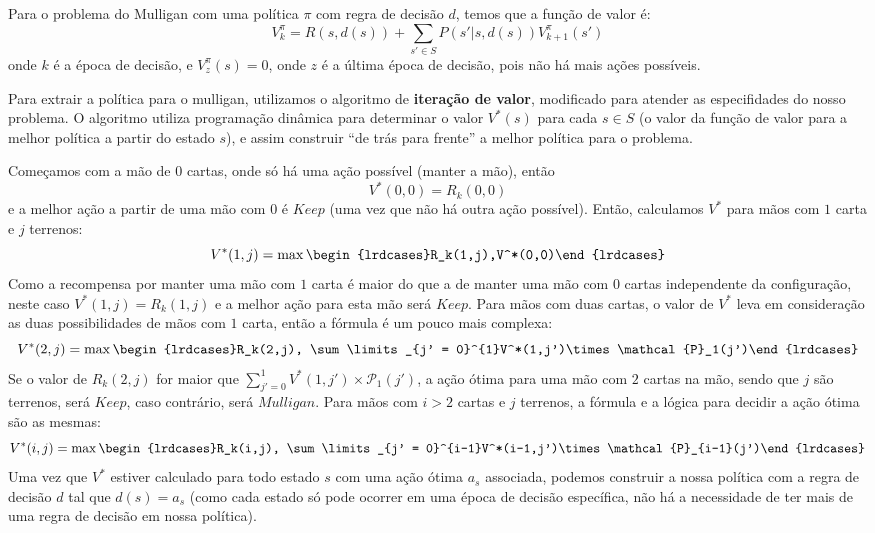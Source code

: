 \documentclass[dvipsnames]{book}
\begin{document}
Para o problema do Mulligan com uma política $\pi$ com regra de decisão $d$, temos que a
função de valor é:
\begin{equation*}
  V^\pi_k = R(s, d(s)) + \sum \limits_{s' \in S}P(s'|s, d(s))V^\pi_{k+1}(s')
\end{equation*}
onde $k$ é a época de decisão, e $V^\pi_z(s) = 0$, onde $z$ é a última época de decisão, pois
não há mais ações possíveis.

Para extrair a política para o mulligan, utilizamos o algoritmo de \textbf{iteração de valor},
modificado para atender as especifidades do nosso problema. O algoritmo utiliza programação
dinâmica para determinar o valor $V^*(s)$ para cada $s \in S$ (o valor da função de valor para
a melhor política a partir do estado $s$), e assim construir ``de trás para frente'' a melhor
política para o problema.

Começamos com a mão de $0$ cartas, onde só há uma ação possível (manter a mão), então
\begin{equation*}
  V^*(0,0)=R_k(0,0)
\end{equation*}
e a melhor ação a partir de uma mão com $0$ é $Keep$ (uma vez que não há
outra ação possível). Então, calculamos $V^*$ para mãos com $1$ carta e $j$ terrenos:
\begin{equation*}
  V^*(1,j) = \max\begin{lrdcases}R_k(1,j),V^*(0,0)\end{lrdcases}
\end{equation*}
Como a recompensa por manter uma mão com $1$ carta é maior do que a de manter uma mão com
$0$ cartas independente da configuração, neste caso $V^*(1,j)=R_k(1,j)$ e a melhor ação para
esta mão será $Keep$. Para mãos com duas cartas, o valor de $V^*$ leva em consideração as duas
possibilidades de mãos com $1$ carta, então a fórmula é um pouco mais complexa:
\begin{equation*}
  V^*(2,j) =  \max\begin{lrdcases}R_k(2,j),
              \sum\limits_{j' = 0}^{1}V^*(1,j')\times\mathcal{P}_1(j')\end{lrdcases}
\end{equation*}
Se o valor de $R_k(2,j)$ for maior que $\sum\limits_{j' = 0}^{1}V^*(1,j')\times\mathcal{P}_1(j')$,
a ação ótima para uma mão com $2$ cartas na mão, sendo que $j$ são terrenos, será $Keep$, caso
contrário, será $Mulligan$. Para mãos com $i>2$ cartas e $j$ terrenos, a fórmula e a lógica para
decidir a ação ótima são as mesmas:
\begin{equation*}
  V^*(i,j) =  \max\begin{lrdcases}R_k(i,j),
              \sum\limits_{j' = 0}^{i-1}V^*(i-1,j')\times\mathcal{P}_{i-1}(j')\end{lrdcases}
\end{equation*}
Uma vez que $V^*$ estiver calculado para todo estado $s$ com uma ação ótima $a_s$ associada,
podemos construir a nossa política com a regra de decisão $d$ tal que $d(s) = a_s$ (como cada
estado só pode ocorrer em uma época de decisão específica, não há a necessidade de ter mais
de uma regra de decisão em nossa política).
\end{document}
